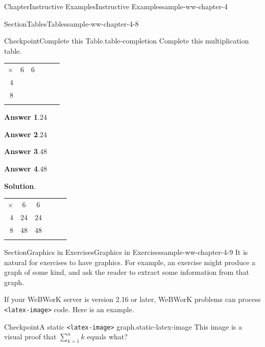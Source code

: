 \documentclass[oneside,10pt,]{book}
\newcommand{\blocktitlefont}{\relax}
\newcommand{\tabularfont}{\relax}
\newcommand{\mono}[1]{\texttt{#1}}
\newlength{\fillinmaxwidth}
\newlength{\fillincontract}
\newlength{\charmaxwidth}\setlength{\charmaxwidth}{0.5em}
\newlength{\charminwidth}\setlength{\charminwidth}{0.1em}
\newlength{\fillinheight}
\newcommand{\fillintext}[1]{%
\setlength{\fillinmaxwidth}{#1\charmaxwidth}%
\setlength{\fillincontract}{#1\charminwidth}%
\setlength{\fillinheight}{\baselineskip}\addtolength{\fillinheight}{1.2pt}%
\strut\nobreak\leaders\vbox{\hrule width 0.3pt height 0.3pt \vskip -1.2pt}\hskip 1\fillinmaxwidth minus \fillincontract\nobreak\strut%
}
\numberwithin{equation}{section}
\newcommand{\hrulethin}  {\noalign{\hrule height 0.04em}}
\newcommand{\hrulethick} {\noalign{\hrule height 0.11em}}
\begin{document}
\begin{chapterptx}{Chapter}{Instructive Examples}{}{Instructive Examples}{}{}{sample-ww-chapter-4}
\begin{sectionptx}{Section}{Tables}{}{Tables}{}{}{sample-ww-chapter-4-8}
\begin{inlineexercise}{Checkpoint}{Complete this Table.}{table-completion}
Complete this multiplication table.%
\begin{center}%
{\tabularfont%
}%
\end{center}%
\par\smallskip%
\noindent\textbf{\blocktitlefont Answer 1}.\hypertarget{table-completion-3}{}\quad{}\(24\)%
\par\smallskip%
\noindent\textbf{\blocktitlefont Answer 2}.\hypertarget{table-completion-4}{}\quad{}\(24\)%
\par\smallskip%
\noindent\textbf{\blocktitlefont Answer 3}.\hypertarget{table-completion-5}{}\quad{}\(48\)%
\par\smallskip%
\noindent\textbf{\blocktitlefont Answer 4}.\hypertarget{table-completion-6}{}\quad{}\(48\)%
\par\smallskip%
\noindent\textbf{\blocktitlefont Solution}.\hypertarget{table-completion-7}{}\quad{}\begin{center}%
{\tabularfont%
\begin{tabular}{rCcAcA}
\(\times\)&\(6\)&\(6\)\tabularnewline\hrulethick
\(4\)&\(24\)&\(24\)\tabularnewline\hrulethin
\(8\)&\(48\)&\(48\)\tabularnewline\hrulethin
\end{tabular}
}%
\end{center}%
\end{inlineexercise}%
\end{sectionptx}
%
%
\typeout{************************************************}
\typeout{************************************************}
%
\begin{sectionptx}{Section}{Graphics in Exercises}{}{Graphics in Exercises}{}{}{sample-ww-chapter-4-9}
It is natural for exercises to have graphics. For example, an exercise might produce a graph of some kind, and ask the reader to extract some information from that graph.%
\par
If your WeBWorK server is version 2.16 or later, WeBWorK problems can process \mono{<latex-image>} code. Here is an example.%
\begin{inlineexercise}{Checkpoint}{A static \mono{<latex-image>} graph.}{static-latex-image}%
This image is a visual proof that \(\sum_{k=1}^{n}k\) equals what?%
\begin{image}{0.25}{0.5}{0.25}{}%

\end{image}
\end{inlineexercise}
\end{sectionptx}
\end{chapterptx}
\end{document}
